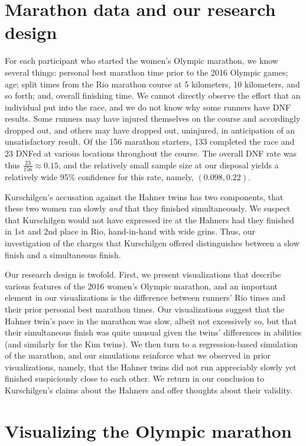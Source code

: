 \documentclass[12pt,titlepage]{article}
\begin{document}
\section*{Marathon data and our research design}

For each participant who started the women's Olympic marathon, we know
several things: personal best marathon time prior to the 2016 Olympic
games; age; split times from the Rio marathon course at 5 kilometers,
10 kilometers, and so forth; and, overall finishing time. We cannot
directly observe the effort that an individual put into the race, and
we do not know why some runners have DNF results.  Some runners may
have injured themselves on the course and accordingly dropped out, and
others may have dropped out, uninjured, in anticipation of an
unsatisfactory result. Of the 156 marathon starters, 133 completed the
race and 23 DNFed at various locations throughout the course. The
overall DNF rate was thus $\frac{23}{156} \approx 0.15$, and the
relatively small sample size at our disposal yields a relatively wide
95\% confidence for this rate, namely, $\left(0.098, 0.22\right)$.

Kurschilgen's accusation against the Hahner twins has two components,
that these two women ran slowly \emph{and} that they finished
simultaneously.  We suspect that Kurschilgen would not have expressed
ire at the Hahners had they finished in 1st and 2nd place in Rio,
hand-in-hand with wide grins.  Thus, our investigation of the charges
that Kurschilgen offered distinguishes between a slow finish and a
simultaneous finish.

Our research design is twofold.  First, we present visualizations that
describe various features of the 2016 women's Olympic marathon, and an
important element in our visualizations is the difference between
runners' Rio times and their prior personal best marathon times.  Our
visualizations suggest that the Hahner twin's pace in the marathon was
slow, albeit not excessively so, but that their simultaneous finish
was quite unusual given the twins' differences in abilities (and
similarly for the Kim twins).  We then turn to a regression-based
simulation of the marathon, and our simulations reinforce what we
observed in prior visualizations, namely, that the Hahner twins did
not run appreciably slowly yet finished suspiciously close to each
other.  We return in our conclusion to Kurschilgen's claims about the
Hahners and offer thoughts about their validity.

\section*{Visualizing the Olympic marathon}
\end{document}
